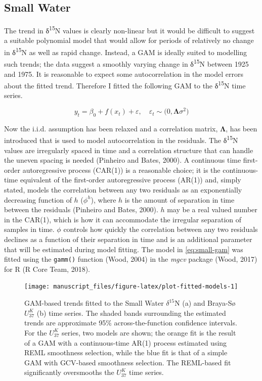 \documentclass[12pt,]{article}
\newcommand{\uk}{\ensuremath{\mathit{U}^{\mathit{K}}_{\mathup{37}}}}
\begin{document}
\subsection{Small Water}\label{small-water}

The trend in δ\textsuperscript{15}N values is clearly non-linear but it
would be difficult to suggest a suitable polynomial model that would
allow for periods of relatively no change in δ\textsuperscript{15}N as
well as rapid change. Instead, a GAM is ideally suited to modelling such
trends; the data suggest a smoothly varying change in
δ\textsuperscript{15}N between 1925 and 1975. It is reasonable to expect
some autocorrelation in the model errors about the fitted trend.
Therefore I fitted the following GAM to the δ\textsuperscript{15}N time
series.

\begin{equation} \label{eq:small-gam}
y_t = \beta_0 + f(x_t) + \varepsilon, \quad \varepsilon_t \sim \mathcal(0, \boldsymbol{\Lambda}\sigma^2)
\end{equation}

Now the i.i.d. assumption has been relaxed and a correlation matrix,
\(\boldsymbol{\Lambda}\), has been introduced that is used to model
autocorrelation in the residuals. The δ\textsuperscript{15}N values are
irregularly spaced in time and a correlation structure that can handle
the uneven spacing is needed (Pinheiro and Bates, 2000). A continuous
time first-order autoregressive process (CAR(1)) is a reasonable choice;
it is the continuous-time equivalent of the first-order autoregressive
process (AR(1)) and, simply stated, models the correlation between any
two residuals as an exponentially decreasing function of \(h\)
(\(\phi^h\)), where \(h\) is the amount of separation in time between
the residuals (Pinheiro and Bates, 2000). \(h\) may be a real valued
number in the CAR(1), which is how it can accommodate the irregular
separation of samples in time. \(\phi\) controls how quickly the
correlation between any two residuals declines as a function of their
separation in time and is an additional parameter that will be estimated
during model fitting. The model in \eqref{eq:small-gam} was fitted using
the \texttt{gamm()} function (Wood, 2004) in the \emph{mgcv} package
(Wood, 2017) for R (R Core Team, 2018).

\begin{figure}

{\centering \texttt{[image: manuscript\_files/figure-latex/plot-fitted-models-1]} 

}

\caption{GAM-based trends fitted to the Small Water $\delta^{15}\text{N}$ (a) and Braya-Sø \uk{} (b) time series. The shaded bands surrounding the estimated trends are approximate 95\% across-the-function confidence intervals. For the \uk{} series, two models are shown; the orange fit is the result of a GAM with a continuous-time AR(1) process estimated using REML smoothness selection, while the blue fit is that of a simple GAM with GCV-based smoothness selection. The REML-based fit significantly oversmooths the \uk{} time series.}\label{fig:plot-fitted-models}
\end{figure}
\end{document}
